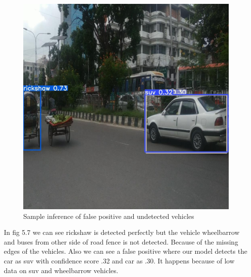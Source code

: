 \begin{figure}[h]
    \centering
    \includegraphics[max width=\textwidth]{images/ours/1.jpg}
   \caption{ Sample inference of false positive and undetected vehicles}
    \label{fig:inference2354}
\end{figure}

In fig 5.7 we can see rickshaw is detected perfectly but the vehicle wheelbarrow and buses from other side of road fence is not detected. Because of the missing edges of the vehicles. Also we can see a false positive where our model detects the car as suv with confidence score .32 and car as .30. It happens because of low data on suv and wheelbarrow vehicles. 

\newpage

